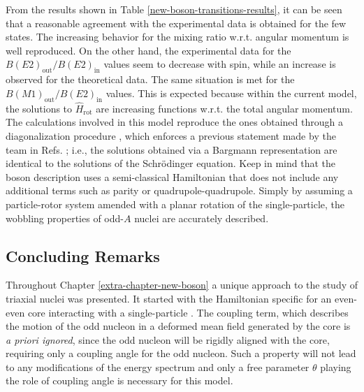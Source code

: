 From the results shown in Table \ref{new-boson-transitions-results}, it can be seen that a reasonable agreement with the experimental data is obtained for the few states. The increasing behavior for the mixing ratio w.r.t. angular momentum is well reproduced. On the other hand, the experimental data for the $B(E2)_\text{out}/B(E2)_\text{in}$ values seem to decrease with spin, while an increase is observed for the theoretical data. The same situation is met for the $B(M1)_\text{out}/B(E2)_\text{in}$ values. This is expected because within the current model, the solutions to $\hat{H}_\text{rot}$ are increasing functions w.r.t. the total angular momentum. The calculations involved in this model reproduce the ones obtained through a diagonalization procedure \cite{tanabe2017stability}, which enforces a previous statement made by the team in Refs. \cite{raduta2017semiclassical,raduta2018wobbling}; i.e., the solutions obtained via a Bargmann representation are identical to the solutions of the Schrödinger equation. Keep in mind that the boson description uses a semi-classical Hamiltonian that does not include any additional terms such as parity or quadrupole-quadrupole. Simply by assuming a particle-rotor system amended with a planar rotation of the single-particle, the wobbling properties of odd-$A$ nuclei are accurately described.

\subsection{Concluding Remarks}
\label{new-boson-concluding-remarks}

Throughout Chapter \ref{extra-chapter-new-boson} a unique approach to the study of triaxial nuclei was presented. It started with the Hamiltonian specific for an even-even core interacting with a single-particle \cite{raduta2017semiclassical,raduta2018wobbling,raduta2020approach}. The coupling term, which describes the motion of the odd nucleon in a deformed mean field generated by the core is \emph{a priori ignored}, since the odd nucleon will be rigidly aligned with the core, requiring only a coupling angle for the odd nucleon. Such a property will not lead to any modifications of the energy spectrum and only a free parameter $\theta$ playing the role of coupling angle is necessary for this model.

